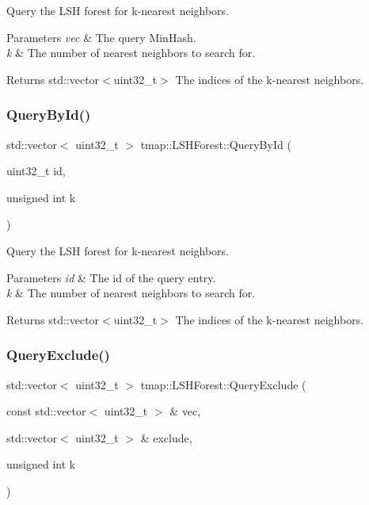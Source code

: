 Query the L\+SH forest for k-\/nearest neighbors. 


\begin{DoxyParams}{Parameters}
{\em vec} & The query Min\+Hash. \\
\hline
{\em k} & The number of nearest neighbors to search for. \\
\hline
\end{DoxyParams}
\begin{DoxyReturn}{Returns}
std\+::vector$<$uint32\+\_\+t$>$ The indices of the k-\/nearest neighbors. 
\end{DoxyReturn}
\mbox{\label{classtmap_1_1LSHForest_aa200b72cc60947e5e03fd72ea726a999}} 
\subsubsection{\texorpdfstring{Query\+By\+Id()}{QueryById()}}
{\footnotesize\ttfamily std\+::vector$<$ uint32\+\_\+t $>$ tmap\+::\+L\+S\+H\+Forest\+::\+Query\+By\+Id (\begin{DoxyParamCaption}\item[{uint32\+\_\+t}]{id,  }\item[{unsigned int}]{k }\end{DoxyParamCaption})}



Query the L\+SH forest for k-\/nearest neighbors. 


\begin{DoxyParams}{Parameters}
{\em id} & The id of the query entry. \\
\hline
{\em k} & The number of nearest neighbors to search for. \\
\hline
\end{DoxyParams}
\begin{DoxyReturn}{Returns}
std\+::vector$<$uint32\+\_\+t$>$ The indices of the k-\/nearest neighbors. 
\end{DoxyReturn}
\mbox{\label{classtmap_1_1LSHForest_a7aba9b1df0273b71ed2d9233d05ed0db}} 
\subsubsection{\texorpdfstring{Query\+Exclude()}{QueryExclude()}}
{\footnotesize\ttfamily std\+::vector$<$ uint32\+\_\+t $>$ tmap\+::\+L\+S\+H\+Forest\+::\+Query\+Exclude (\begin{DoxyParamCaption}\item[{const std\+::vector$<$ uint32\+\_\+t $>$ \&}]{vec,  }\item[{std\+::vector$<$ uint32\+\_\+t $>$ \&}]{exclude,  }\item[{unsigned int}]{k }\end{DoxyParamCaption})}



